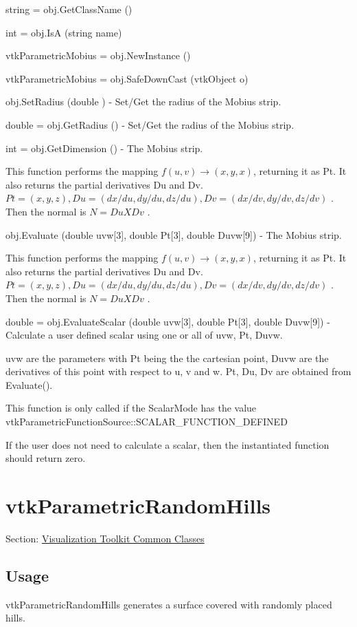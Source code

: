 \begin{DoxyItemize}
\item {\ttfamily string = obj.\-Get\-Class\-Name ()}  
\item {\ttfamily int = obj.\-Is\-A (string name)}  
\item {\ttfamily vtk\-Parametric\-Mobius = obj.\-New\-Instance ()}  
\item {\ttfamily vtk\-Parametric\-Mobius = obj.\-Safe\-Down\-Cast (vtk\-Object o)}  
\item {\ttfamily obj.\-Set\-Radius (double )} -\/ Set/\-Get the radius of the Mobius strip.  
\item {\ttfamily double = obj.\-Get\-Radius ()} -\/ Set/\-Get the radius of the Mobius strip.  
\item {\ttfamily int = obj.\-Get\-Dimension ()} -\/ The Mobius strip.

This function performs the mapping $f(u,v) \rightarrow (x,y,x)$, returning it as Pt. It also returns the partial derivatives Du and Dv. $Pt = (x, y, z), Du = (dx/du, dy/du, dz/du), Dv = (dx/dv, dy/dv, dz/dv)$ . Then the normal is $N = Du X Dv$ .  
\item {\ttfamily obj.\-Evaluate (double uvw\mbox{[}3\mbox{]}, double Pt\mbox{[}3\mbox{]}, double Duvw\mbox{[}9\mbox{]})} -\/ The Mobius strip.

This function performs the mapping $f(u,v) \rightarrow (x,y,x)$, returning it as Pt. It also returns the partial derivatives Du and Dv. $Pt = (x, y, z), Du = (dx/du, dy/du, dz/du), Dv = (dx/dv, dy/dv, dz/dv)$ . Then the normal is $N = Du X Dv$ .  
\item {\ttfamily double = obj.\-Evaluate\-Scalar (double uvw\mbox{[}3\mbox{]}, double Pt\mbox{[}3\mbox{]}, double Duvw\mbox{[}9\mbox{]})} -\/ Calculate a user defined scalar using one or all of uvw, Pt, Duvw.

uvw are the parameters with Pt being the the cartesian point, Duvw are the derivatives of this point with respect to u, v and w. Pt, Du, Dv are obtained from Evaluate().

This function is only called if the Scalar\-Mode has the value vtk\-Parametric\-Function\-Source\-::\-S\-C\-A\-L\-A\-R\-\_\-\-F\-U\-N\-C\-T\-I\-O\-N\-\_\-\-D\-E\-F\-I\-N\-E\-D

If the user does not need to calculate a scalar, then the instantiated function should return zero.


\end{DoxyItemize}\hypertarget{vtkcommon_vtkparametricrandomhills}{}\section{vtk\-Parametric\-Random\-Hills}\label{vtkcommon_vtkparametricrandomhills}
Section\-: \hyperlink{sec_vtkcommon}{Visualization Toolkit Common Classes} \hypertarget{vtkwidgets_vtkxyplotwidget_Usage}{}\subsection{Usage}\label{vtkwidgets_vtkxyplotwidget_Usage}
vtk\-Parametric\-Random\-Hills generates a surface covered with randomly placed hills.


